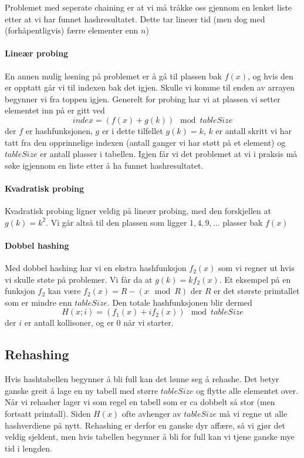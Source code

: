 Problemet med seperate chaining er at vi må tråkke oss gjennom en lenket liste etter at vi har funnet hashresultatet. Dette tar lineær tid (men dog med (forhåpentligvis) færre elementer enn $ n $)


\paragraph{Lineær probing}
En annen mulig løsning på problemet er å gå til plassen bak $ f(x) $, og hvis den er opptatt går vi til indexen bak det igjen. Skulle vi komme til enden av arrayen begynner vi fra toppen igjen. Generelt for probing har vi at plassen vi setter elementet inn på er gitt ved
\[ index = (f(x) + g(k)) \mod{tableSize} \]
der $ f $ er hashfunksjonen, $ g $ er i dette tilfellet $ g(k) = k $, $ k $ er antall skritt vi har tatt fra den opprinnelige indexen (antall ganger vi har støtt på et element) og $ tableSize $ er antall plasser i tabellen. Igjen får vi det problemet at vi i praksis må søke igjennom en liste etter å ha funnet hashresultatet. 

\paragraph{Kvadratisk probing}
Kvadratisk probing ligner veldig på lineær probing, med den forskjellen at $ g(k) = k^2 $. Vi går altså til den plassen som ligger $ 1, 4, 9, ... $ plasser bak $ f(x) $

\paragraph{Dobbel hashing}
Med dobbel hashing har vi en ekstra hashfunksjon $ f_2(x) $ som vi regner ut hvis vi skulle støte på problemer. Vi får da at $ g(k) = k f_2(x) $. Et eksempel på en funksjon $ f_2 $ kan være $ f_2(x) = R-(x \mod R) $ der $ R $ er det største primtallet som er mindre enn $ tableSize $. Den totale hashfunksjonen blir dermed 
\[ H(x;i) = (f_1(x) + if_2(x)) \mod tableSize \]
der $ i $ er antall kollisoner, og er $ 0 $ når vi starter.



\subsection{Rehashing}
Hvis hashtabellen begynner å bli full kan det lønne seg å rehashe. Det betyr ganske greit å lage en ny tabell med større $ tableSize $ og flytte alle elementet over. Når vi rehasher lager vi som regel en tabell som er ca dobbelt så stor (men fortsatt primtall). Siden $ H(x) $ ofte avhenger av $ tableSize $ må vi regne ut alle hashverdiene på nytt. Rehashing er derfor en ganske dyr affære, så vi gjør det veldig sjeldent, men hvis tabellen begynner å bli for full kan vi tjene ganske mye tid i lengden. 


